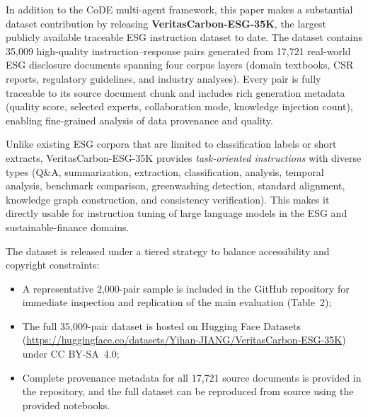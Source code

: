In addition to the CoDE multi-agent framework, this paper makes a substantial dataset contribution by releasing \textbf{VeritasCarbon-ESG-35K}, the largest publicly available traceable ESG instruction dataset to date. The dataset contains 35,009 high-quality instruction--response pairs generated from 17,721 real-world ESG disclosure documents spanning four corpus layers (domain textbooks, CSR reports, regulatory guidelines, and industry analyses). Every pair is fully traceable to its source document chunk and includes rich generation metadata (quality score, selected experts, collaboration mode, knowledge injection count), enabling fine-grained analysis of data provenance and quality.

Unlike existing ESG corpora that are limited to classification labels or short extracts, VeritasCarbon-ESG-35K provides \textit{task-oriented instructions} with diverse types (Q\&A, summarization, extraction, classification, analysis, temporal analysis, benchmark comparison, greenwashing detection, standard alignment, knowledge graph construction, and consistency verification). This makes it directly usable for instruction tuning of large language models in the ESG and sustainable-finance domains.

The dataset is released under a tiered strategy to balance accessibility and copyright constraints:
\begin{itemize}[noitemsep]
    \item A representative 2,000-pair sample is included in the GitHub repository for immediate inspection and replication of the main evaluation (Table~2);
    \item The full 35,009-pair dataset is hosted on Hugging Face Datasets (\url{https://huggingface.co/datasets/Yihan-JIANG/VeritasCarbon-ESG-35K}) under CC BY-SA~4.0;
    \item Complete provenance metadata for all 17,721 source documents is provided in the repository, and the full dataset can be reproduced from source using the provided notebooks.
\end{itemize}
